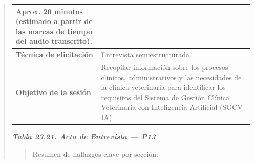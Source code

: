 \documentclass[
]{article}
\begin{document}
\begin{quote}
{\begin{longtable}[]{|
  >{\raggedright\arraybackslash}p{}|
  >{\raggedright\arraybackslash}p{}|}
\begin{minipage}[t]{\linewidth}
Aprox. 20 minutos (estimado a partir de las marcas de tiempo del audio transcrito).
\end{minipage} \\
\hline
\textbf{Técnica de elicitación} & \begin{minipage}[t]{\linewidth}\raggedright
Entrevista semiestructurada.
\end{minipage} \\
\hline
\textbf{Objetivo de la sesión} & \begin{minipage}[t]{\linewidth}\raggedright
Recopilar información sobre los procesos clínicos, administrativos y las necesidades de la clínica veterinaria para identificar los requisitos del Sistema de Gestión Clínica Veterinaria con Inteligencia Artificial (SGCV-IA).
\end{minipage} \\
\hline
\end{longtable}
}

\protect{}\label{_bookmark_P13_acta}{}\emph{\textbf{Tabla 23.21. Acta de Entrevista --- P13}}

\begin{quote}
Resumen de hallazgos clave por sección:
\end{quote}


\end{quote}
\end{document}
